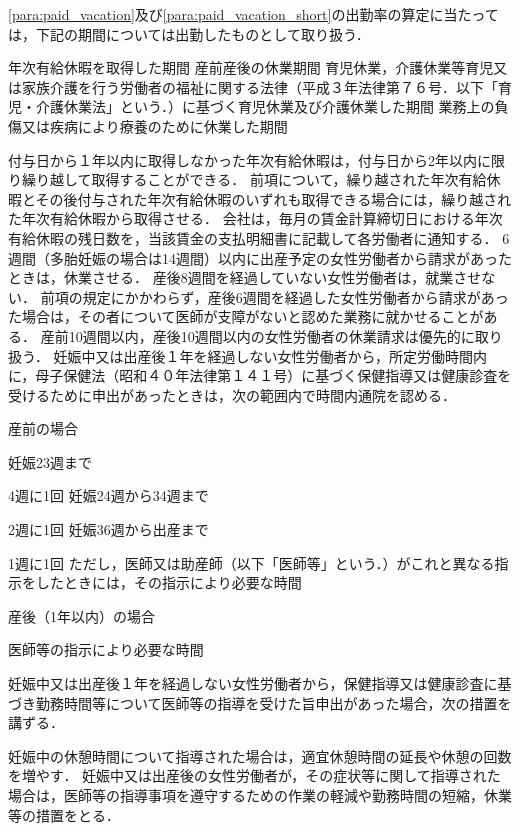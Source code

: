 \documentclass[11pt,a4paper]{jsarticle}
\begin{document}
\term
\ref{para:paid_vacation}及び\ref{para:paid_vacation_short}の出勤率の算定に当たっては，下記の期間については出勤したものとして取り扱う．
\begin{enumerate}
	\itm 年次有給休暇を取得した期間
	\itm 産前産後の休業期間
	\itm 育児休業，介護休業等育児又は家族介護を行う労働者の福祉に関する法律（平成３年法律第７６号．以下「育児・介護休業法」という．）に基づく育児休業及び介護休業した期間
	\itm 業務上の負傷又は疾病により療養のために休業した期間
\end{enumerate}
\term
付与日から１年以内に取得しなかった年次有給休暇は，付与日から2年以内に限り繰り越して取得することができる．
\term
前項について，繰り越された年次有給休暇とその後付与された年次有給休暇のいずれも取得できる場合には，繰り越された年次有給休暇から取得させる．
\term
会社は，毎月の賃金計算締切日における年次有給休暇の残日数を，当該賃金の支払明細書に記載して各労働者に通知する．
6週間（多胎妊娠の場合は14週間）以内に出産予定の女性労働者から請求があったときは，休業させる．
\term
産後8週間を経過していない女性労働者は，就業させない．
\term
前項の規定にかかわらず，産後6週間を経過した女性労働者から請求があった場合は，その者について医師が支障がないと認めた業務に就かせることがある．
\term
産前10週間以内，産後10週間以内の女性労働者の休業請求は優先的に取り扱う． 
妊娠中又は出産後１年を経過しない女性労働者から，所定労働時間内に，母子保健法（昭和４０年法律第１４１号）に基づく保健指導又は健康診査を受けるために申出があったときは，次の範囲内で時間内通院を認める．
\begin{enumerate}
	\itm 産前の場合
	\begin{enumerate}
		\itm 妊娠23週まで\par 4週に1回
		\itm 妊娠24週から34週まで\par 2週に1回
		\itm 妊娠36週から出産まで\par 1週に1回
		\itm ただし，医師又は助産師（以下「医師等」という．）がこれと異なる指示をしたときには，その指示により必要な時間
	\end{enumerate}
	\itm 産後（1年以内）の場合
	\begin{enumerate}
		\itm 医師等の指示により必要な時間
	\end{enumerate}
\end{enumerate}

\term
妊娠中又は出産後１年を経過しない女性労働者から，保健指導又は健康診査に基づき勤務時間等について医師等の指導を受けた旨申出があった場合，次の措置を講ずる．
\begin{enumerate}
	\itm 妊娠中の休憩時間について指導された場合は，適宜休憩時間の延長や休憩の回数を増やす．
	\itm 妊娠中又は出産後の女性労働者が，その症状等に関して指導された場合は，医師等の指導事項を遵守するための作業の軽減や勤務時間の短縮，休業等の措置をとる．
\end{enumerate}
\end{document}
